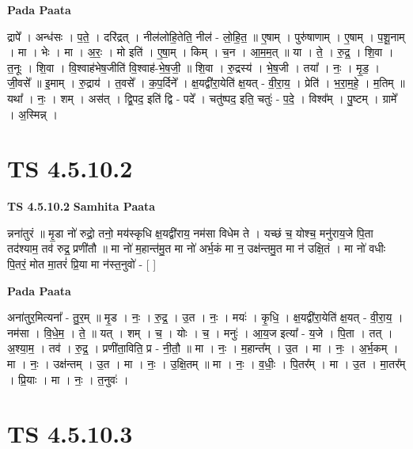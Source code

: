 \documentclass[17pt]{extarticle}
\begin{document}
\textbf{Pada Paata} \newline

द्रापे᳚ । अन्ध॑सः । प॒ते॒ । दरि॑द्रत् । नील॑लोहि॒तेति॒ नील॑ - लो॒हि॒त॒ ॥ ए॒षाम् । पुरु॑षाणाम् । ए॒षाम् । प॒शू॒नाम् । मा । भेः । मा । अ॒रः॒ । मो इति॑ । ए॒षा॒म् । किम् । च॒न । आ॒म॒म॒त् ॥ या । ते॒ । रु॒द्र॒ । शि॒वा । त॒नूः । शि॒वा । वि॒श्वाह॑भेष॒जीति॑ वि॒श्वाह॑-भे॒ष॒जी॒ ॥ शि॒वा । रु॒द्रस्य॑ । भे॒ष॒जी । तया᳚ । नः॒ । मृ॒ड॒ । जी॒वसे᳚ ॥ इ॒माम् । रु॒द्राय॑ । त॒वसे᳚ । क॒प॒र्दिने᳚ । क्ष॒यद्वी॑रा॒येति॑ क्ष॒यत् - वी॒रा॒य॒ । प्रेति॑ । भ॒रा॒म॒हे॒ । म॒तिम् ॥ यथा᳚ । नः॒ । शम् । अस॑त् । द्वि॒पद॒ इति॑ द्वि - पदे᳚ । चतु॑ष्पद॒ इति॒ चतुः॑ - प॒दे॒ । विश्व᳚म् । पु॒ष्टम् । ग्रामे᳚ । अ॒स्मिन्न् ।  \newline





\section{ TS 4.5.10.2 }

\textbf{TS 4.5.10.2 } \newline
\textbf{Samhita Paata} \newline

न्नना॑तुरं ॥ मृ॒डा नो॑ रुद्रो॒ तनो॒ मय॑स्कृधि क्ष॒यद्वी॑राय॒ नम॑सा विधेम ते । यच्छं च॒ योश्च॒ मनु॑राय॒जे पि॒ता तद॑श्याम॒ तव॑ रुद्र॒ प्रणी॑तौ ॥ मा नो॑ म॒हान्त॑मु॒त मा नो॑ अर्भ॒कं मा न॒ उक्ष॑न्तमु॒त मा न॑ उक्षि॒तं । मा नो॑ वधीः पि॒तरं॒ मोत मा॒तरं॑ प्रि॒या मा न॑स्त॒नुवो॑ - [  ] \newline

\textbf{Pada Paata} \newline

अना॑तुर॒मित्यना᳚ - तु॒र॒म् ॥ मृ॒ड । नः॒ । रु॒द्र॒ । उ॒त । नः॒ । मयः॑ । कृ॒धि॒ । क्ष॒यद्वी॑रा॒येति॑ क्ष॒यत् - वी॒रा॒य॒ । नम॑सा । वि॒धे॒म॒ । ते॒ ॥ यत् । शम् । च॒ । योः । च॒ । मनुः॑ । आ॒य॒ज इत्या᳚ - य॒जे । पि॒ता । तत् । अ॒श्या॒म॒ । तव॑ । रु॒द्र॒ । प्रणी॑ता॒विति॒ प्र - नी॒तौ॒ ॥ मा । नः॒ । म॒हान्त᳚म् । उ॒त । मा । नः॒ । अ॒र्भ॒कम् । मा । नः॒ । उक्ष॑न्तम् । उ॒त । मा । नः॒ । उ॒क्षि॒तम् ॥ मा । नः॒ । व॒धीः॒ । पि॒तर᳚म् । मा । उ॒त । मा॒तर᳚म् । प्रि॒याः । मा । नः॒ । त॒नुवः॑ ।  \newline





\section{ TS 4.5.10.3 }
\end{document}
